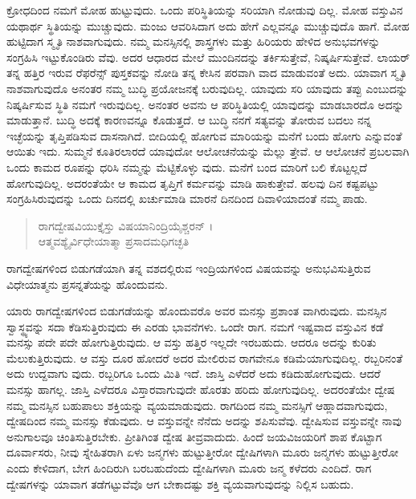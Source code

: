ಕ್ರೋಧದಿಂದ ನಮಗೆ ಮೋಹ ಹುಟ್ಟುವುದು. ಒಂದು ಪರಿಸ್ಥಿತಿಯನ್ನು ಸರಿಯಾಗಿ ನೋಡುವು ದಿಲ್ಲ. ಮೋಹ ವಸ್ತುವಿನ ಯಥಾರ್ಥ ಸ್ಥಿತಿಯನ್ನು ಮುಚ್ಚುವುದು. ಮಂಜು ಆವರಿಸಿದಾಗ ಅದು ಹೇಗೆ ಎಲ್ಲವನ್ನೂ ಮುಚ್ಚುವುದೊ ಹಾಗೆ. ಮೋಹ ಹುಟ್ಟಿದಾಗ ಸ್ಮೃತಿ ನಾಶವಾಗುವುದು. ನಮ್ಮ ಮನಸ್ಸಿನಲ್ಲಿ ಶಾಸ್ತ್ರಗಳು ಮತ್ತು ಹಿರಿಯರು ಹೇಳಿದ ಅನುಭವಗಳನ್ನು ಸಂಗ್ರಹಿಸಿ ಇಟ್ಟುಕೊಂಡಿರು ವೆವು. ಅದರ ಆಧಾರದ ಮೇಲೆ ಮುಂದಿನದನ್ನು ತರ್ಕಿಸುತ್ತೇವೆ, ನಿಷ್ಕರ್ಷಿಸುತ್ತೇವೆ. ಲಾಯರ್ ತನ್ನ ಹತ್ತಿರ ಇರುವ ರೆಫರೆನ್ಸ್ ಪುಸ್ತಕವನ್ನು ನೋಡಿ ತನ್ನ ಕೇಸಿನ ಪರವಾಗಿ ವಾದ ಮಾಡುವಂತೆ ಅದು. ಯಾವಾಗ ಸ್ಮೃತಿ ನಾಶವಾಗುವುದೊ ಅನಂತರ ನಮ್ಮ ಬುದ್ಧಿ ಪ್ರಯೋಜನಕ್ಕೆ ಬರುವುದಿಲ್ಲ. ಯಾವುದು ಸರಿ ಯಾವುದು ತಪ್ಪು ಎಂಬುದನ್ನು ನಿಷ್ಕರ್ಷಿಸುವ ಸ್ಥಿತಿ ನಮಗೆ ಇರುವುದಿಲ್ಲ. ಅನಂತರ ಅವನು ಆ ಪರಿಸ್ಥಿತಿಯಲ್ಲಿ ಯಾವುದನ್ನು ಮಾಡಬಾರದೊ ಅದನ್ನು ಮಾಡುತ್ತಾನೆ. ಬುದ್ಧಿ ಅದಕ್ಕೆ ಕಾರಣವನ್ನೂ ಕೊಡುತ್ತದೆ. ಆ ಬುದ್ಧಿ ನನಗೆ ಸತ್ಯವನ್ನು ತೋರುವ ಬದಲು ನನ್ನ ಇಚ್ಛೆಯನ್ನು ತೃಪ್ತಿಪಡಿಸುವ ದಾಸನಾಗಿದೆ. ಬೀದಿಯಲ್ಲಿ ಹೋಗುವ ಮಾರಿಯನ್ನು ಮನೆಗೆ ಬಂದು ಹೋಗು ಎನ್ನುವಂತೆ ಆಯಿತು ಇದು. ಸುಮ್ಮನೆ ಕೂತಿರಲಾರದೆ ಯಾವುದೋ ಆಲೋಚನೆಯನ್ನು ಮೆಲ್ಲು ತ್ತೇವೆ. ಆ ಆಲೋಚನೆ ಪ್ರಬಲವಾಗಿ ಒಂದು ಕಾಮದ ರೂಪನ್ನು ಧರಿಸಿ ನಮ್ಮನ್ನು ಮೆಟ್ಟಿಕೊಳ್ಳು ವುದು. ಮನೆಗೆ ಬಂದ ಮಾರಿಗೆ ಬಲಿ ಕೊಟ್ಟಲ್ಲದೆ ಹೋಗುವುದಿಲ್ಲ. ಅದರಂತೆಯೇ ಆ ಕಾಮದ ತೃಪ್ತಿಗೆ ಕರ್ಮವನ್ನು ಮಾಡಿ ಹಾಕುತ್ತೇವೆ. ಹಲವು ದಿನ ಕಷ್ಟಪಟ್ಟು ಸಂಗ್ರಹಿಸಿರುವುದನ್ನು ಒಂದು ದಿನದಲ್ಲಿ ಖರ್ಚುಮಾಡಿ ಮಾರನೆ ದಿನದಿಂದ ದಿವಾಳಿಯಾದಂತೆ ನಮ್ಮ ಪಾಡು.

\begin{verse}
ರಾಗದ್ವೇಷವಿಯುಕ್ತೈಸ್ತು ವಿಷಯಾನಿಂದ್ರಿಯೈಶ್ಚರನ್ ।\\ಆತ್ಮವಶ್ಯೈರ್ವಿಧೇಯಾತ್ಮಾ ಪ್ರಸಾದಮಧಿಗಚ್ಛತಿ 
\end{verse}

{\small ರಾಗದ್ವೇಷಗಳಿಂದ ಬಿಡುಗಡೆಯಾಗಿ ತನ್ನ ವಶದಲ್ಲಿರುವ ಇಂದ್ರಿಯಗಳಿಂದ ವಿಷಯವನ್ನು ಅನುಭವಿಸುತ್ತಿರುವ ವಿಧೇಯಾತ್ಮನು ಪ್ರಸನ್ನತೆಯನ್ನು ಹೊಂದುವನು.}

ಯಾರು ರಾಗದ್ವೇಷಗಳಿಂದ ಬಿಡುಗಡೆಯನ್ನು ಹೊಂದುವರೊ ಅವರ ಮನಸ್ಸು ಪ್ರಶಾಂತ ವಾಗಿರುವುದು. ಮನಸ್ಸಿನ ಸ್ವಾಸ್ಥ್ಯವನ್ನು ಸದಾ ಕೆಡಿಸುತ್ತಿರುವುದು ಈ ಎರಡು ಭಾವನೆಗಳು. ಒಂದೇ ರಾಗ. ನಮಗೆ ಇಷ್ಟವಾದ ವಸ್ತುವಿನ ಕಡೆ ಮನಸ್ಸು ಪದೇ ಪದೇ ಹೋಗುತ್ತಿರುವುದು. ಆ ವಸ್ತು ಹತ್ತಿರ ಇಲ್ಲದೇ ಇರಬಹುದು. ಆದರೂ ಅದನ್ನು ಕುರಿತು ಮೆಲುಕುತ್ತಿರುವುದು. ಆ ವಸ್ತು ದೂರ ಹೋದರೆ ಅದರ ಮೇಲಿರುವ ರಾಗವೇನೂ ಕಡಿಮೆಯಾಗುವುದಿಲ್ಲ. ರಬ್ಬರಿನಂತೆ ಅದು ಉದ್ದವಾಗು ವುದು. ರಬ್ಬರಿಗೂ ಒಂದು ಮಿತಿ ಇದೆ. ಜಾಸ್ತಿ ಎಳೆದರೆ ಅದು ಕಡಿದುಹೋಗುವುದು. ಆದರೆ ಮನಸ್ಸು ಹಾಗಲ್ಲ. ಜಾಸ್ತಿ ಎಳೆದರೂ ವಿಸ್ತಾರವಾಗುವುದೇ ಹೊರತು ಹರಿದು ಹೋಗುವುದಿಲ್ಲ. ಅದರಂತೆಯೇ ದ್ವೇಷ ನಮ್ಮ ಮನಸ್ಸಿನ ಬಹುಪಾಲು ಶಕ್ತಿಯನ್ನು ವ್ಯಯಮಾಡುವುದು. ರಾಗದಿಂದ ನಮ್ಮ ಮನಸ್ಸಿಗೆ ಆಹ್ಲಾದವಾಗುವುದು, ದ್ವೇಷದಿಂದ ನಮ್ಮ ಮನಸ್ಸು ಕೆಡುವುದು. ಆ ವಸ್ತುವನ್ನೇ ನೆನೆದು ಅದನ್ನು ಶಪಿಸುವೆವು. ದ್ವೇಷಿಸುವ ವಸ್ತುವನ್ನೇ ನಾವು ಅನುಗಾಲವೂ ಚಿಂತಿಸುತ್ತಿರಬೇಕು. ಪ್ರೀತಿಗಿಂತ ದ್ವೇಷ ತೀವ್ರವಾದುದು. ಹಿಂದೆ ಜಯವಿಜಯರಿಗೆ ಶಾಪ ಕೊಟ್ಟಾಗ ದೂರ್ವಾಸರು, ನೀವು ಸ್ನೇಹಿತರಾಗಿ ಏಳು ಜನ್ಮಗಳು ಹುಟ್ಟುತ್ತೀರೋ ದ್ವೇಷಿಗಳಾಗಿ ಮೂರು ಜನ್ಮಗಳು ಹುಟ್ಟುತ್ತೀರೋ ಎಂದು ಕೇಳಿದಾಗ, ಬೇಗ ಹಿಂದಿರುಗಿ ಬರಬಹುದೆಂದು ದ್ವೇಷಿಗಳಾಗಿ ಮೂರು ಜನ್ಮ ಕಳೆದರು ಎಂದಿದೆ. ರಾಗ ದ್ವೇಷಗಳನ್ನು ಯಾವಾಗ ತಡೆಗಟ್ಟುವೆವೊ ಆಗ ಬೇಕಾದಷ್ಟು ಶಕ್ತಿ ವ್ಯಯವಾಗುವುದನ್ನು ನಿಲ್ಲಿಸ ಬಹುದು.

